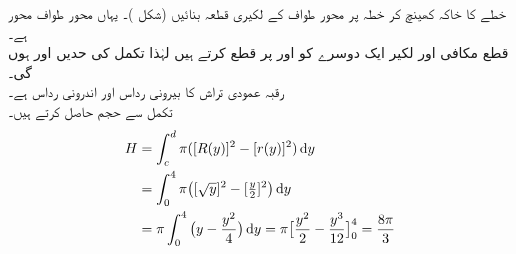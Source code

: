 \quad
خطے کا خاکہ کھینچ کر خطہ پر محور طواف کے  لکیری قطعہ  بنائیں (شکل )۔ یہاں محور طواف محور  ہے۔\\
\quad
قطع مکافی اور لکیر ایک دوسرے کو  اور  پر قطع کرتے ہیں لہٰذا تکمل کی حدیں  اور  ہوں گی۔\\
\quad
رقبہ عمودی تراش کا بیرونی رداس  اور اندرونی رداس  ہے۔\\
\quad
تکمل سے حجم حاصل کرتے ہیں۔
\begin{align*}
H&=\int_c^d\pi([R(y)]^2-[r(y)]^2)\dif y\\
&=\int_0^4\pi\big([\sqrt{y}]^2-[\tfrac{y}{2}]^2\big)\dif y\\
&=\pi\int_0^4\big(y-\frac{y^2}{4}\big)\dif y=\pi\big[\frac{y^2}{2}-\frac{y^3}{12}\big]_0^4=\frac{8\pi}{3}
\end{align*} 
